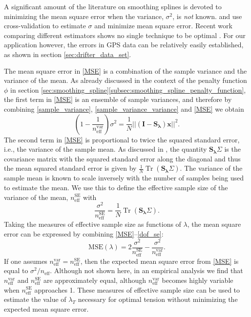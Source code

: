 \documentclass{ametsoc}
\DeclareMathOperator{\Tr}{Tr}
\begin{document}
A significant amount of the literature on smoothing splines is devoted to minimizing the mean square error when the variance, $\sigma^2$, is \emph{not} known. \citet{craven1979-nm} and \citet{wahba1978-jrss-b} use cross-validation to estimate $\sigma$ and minimize mean square error. Recent work comparing different estimators shows no single technique to be optimal \citep{lee2003-csda}. For our application however, the errors in GPS data can be relatively easily established, as shown in section \ref{sec:drifter_data_set}.

The mean square error in \eqref{MSE} is a combination of the sample variance and the variance of the mean. As already discussed in the context of the penalty function $\phi$ in section \ref{sec:smoothing_spline}\ref{subsec:smoothing_spline_penalty_function}, the first term in \eqref{MSE} is an ensemble of sample variances, and therefore by combining \eqref{sample_variance},  \eqref{sample_variance_variance} and \eqref{MSE} we obtain
\begin{equation}
\label{dof_var}
    \left(1-\frac{1}{n_{\textrm{eff}}^{\textrm{var}}} \right)\sigma^2 = \frac{1}{N} || \left( \mathbf{I} - \mathbf{S_\lambda} \right) \mathbf{x} ||^2.
\end{equation}
The second term in \eqref{MSE} is proportional to twice the squared standard error, i.e., the variance of the sample mean. As discussed in \citet{teanby2007-mg}, the quantity $\mathbf{S_\lambda} \Sigma$ is the covariance matrix with the squared standard error along the diagonal and thus the mean squared standard error is given by $\frac{1}{N} \Tr \left( \mathbf{S_\lambda} \Sigma \right)$. The variance of the sample mean is known to scale inversely with the number of samples being used to estimate the mean. We use this to define the effective sample size of the variance of the mean, $n_{\textrm{eff}}^{\textrm{SE}}$ with
\begin{equation}
\label{dof_se}
    \frac{\sigma^2}{n_{\textrm{eff}}^{\textrm{SE}}} = \frac{1}{N} \Tr \left( \mathbf{S_\lambda} \Sigma \right).
\end{equation}
Taking the measures of effective sample size as functions of $\lambda$, the mean square error can be expressed by combining \eqref{MSE}--\eqref{dof_se}:
\begin{equation}
    \textrm{MSE}(\lambda) = 2\frac{\sigma^2}{n_{\textrm{eff}}^{\textrm{SE}}} - \frac{\sigma^2}{n_{\textrm{eff}}^{\textrm{var}}}.
\end{equation}
If one assumes $ n_{\textrm{eff}}^{\textrm{var}} = n_{\textrm{eff}}^{\textrm{SE}}$, then the expected mean square error from \eqref{MSE} is equal to $\sigma^2/n_{\textrm{eff}}$. Although not shown here, in an empirical analysis we find that $n_{\textrm{eff}}^{\textrm{var}}$ and $n_{\textrm{eff}}^{\textrm{SE}}$ are approximately equal, although $n_{\textrm{eff}}^{\textrm{var}}$ becomes highly variable when $n_{\textrm{eff}}^{\textrm{SE}}$ approaches 1. These measures of effective sample size can be used to estimate the value of $\lambda_T$ necessary for optimal tension without minimizing the expected mean square error.
\end{document}
